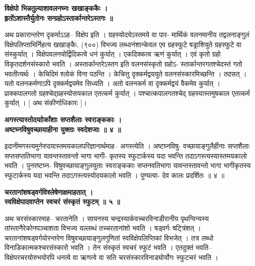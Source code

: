 \documentclass[11pt, openany]{book}
\begin{document}
{{{{\vspace{2mm}
\centering
\hspace{-1cm}
\textbf{
 विक्षेपो भिन्नतुल्याशावलनघ्नः खखाङ्ककैः ।\\
 हृतोंऽशास्तैर्युतोनः सन्ग्रहोऽस्तार्कान्तरेऽस्तगः ॥}

\newpage
\thispagestyle{fancy}
\fancyhf{}
\lhead{[संकीर्णाधिकारः]}
\justifying
 अथ प्रकारान्तरेण दृकर्माऽऽह-- विक्षेप इति । ग्रहस्योदयेऽस्तमये
वा पार-
मार्थिकं वलनमानीय तद्वलनाङ्गुलं विक्षेपलिप्ताभिर्निहत्य खखाङ्कैः.
(९००)
विभज्य लब्धानंशान्केवल एव ग्रहस्फुटे षड्राशियुते ग्रहस्फुटे वा
संस्कुर्यात् ।
विक्षेपवलनयोर्द्विदिकत्वे धनं कुर्यात् । एकदिक्कत्व ऋणं कुर्यात् ।
एवं कृतो
ग्रहो विकृतदर्शनसंस्कारो भवति । अस्तार्कान्तरेऽस्तग इति वलनसंस्कृतो
ग्रहोऽ-
स्तार्कान्तरगतश्चेदस्तं गतो भवतीत्यर्थः । केचिदिमं श्लोकं विना पठन्ति
। केचित्तु
दृक्कर्मद्वययुते वलनसंस्कारमिच्छन्ति । तदसत् । यतो वलनकर्मणाऽपि
दृक्कर्मद्वयमेव
सिध्यति । अतो वलनकर्म वा दृक्कर्मद्वयं वैकमेव कुर्यात् ।
प्राक्कपालगतो
ग्रहश्चेद्ग्रहस्योसयकाल एतत्कर्म कुर्यात् । पश्चात्कपालगतश्चेद्
ग्रहस्यास्तमुषकाल
एतत्कर्म कुर्यात् । [ अथ संकीर्णाधिकारः ]।

\vspace{2mm}
\centering
\hspace{-0.5cm}
\textbf{
 अगस्त्यास्तोदयाोर्कांशाः सप्तशैलाः स्वराङ्ककाः ।\\
 अष्टघ्नविषुवच्छायाहीना युक्ताः स्वदेशजाः ॥ ४ ॥}

\vspace{2mm}
\justifying
 इदानीमगस्त्यमुनेरुदयास्तमयकालपरिज्ञानार्थमाह-- अगस्त्येति ।
अष्टघ्नविषु-
वच्छायाङ्गुलैर्हीनाः सप्तशैलाः सप्तसप्ततिभागा यावन्तस्तावन्तो भागा भागी-
कृतस्य स्फुटार्कस्य यदा भवन्ति तदाऽगस्त्यस्यास्तमयकालो भवति ।
पुनरष्टघ्न-
विषुवच्छायाङ्गुलयुताः स्वराङ्ककाः सप्तनवतिभागा यावन्तस्तावन्तो भागा
भागीकृतस्य स्फुटार्कस्य यदा भवन्ति तदाऽगस्त्यस्योदयकालो भवति ।
पुण्यत्वा-
देव कालः प्रदर्शितः ॥ ४ ॥

\vspace{2mm}
\centering
\hspace{-1.8cm}
\textbf{
 चरतानांशषड्वर्गविश्लेषेणाक्षमाहतात् ।\\
 स्वविक्षेपादवाप्तेन स्वचरं संस्कृतं स्फुटम् ॥ ५ ॥}

\vspace{2mm}
\justifying
 अथ चरसंस्कारमाह-- चरतानेति । सायनस्य चन्द्रस्यार्कवच्चरविनाडीरानीय
पृथग्विन्यस्य तांस्तानैरेकोनपञ्चाशता विभज्य यल्लब्धं
तच्चरतानांशो
भवति । षड्वर्गः षट्त्रिंशत् । चरतानांशषड्वर्गयोरन्तरेण
विषुवच्छायाङ्गुलगुणितां
स्वविक्षेपलिप्तिकां विभजेत् । तत्र लब्धो
विनाडिकात्मकश्चरसंस्कारो
भवति । तेन संस्कृतं स्वचरं स्फुटं भवति । एतदुक्तं भवति--
विक्षेपरचरयोरुभयोरपि
धनत्वे वा ऋणत्वे वा सति चरसंस्कारविनाड्योर्योगः स्फुटचरं भवति ।

}}}}
\end{document}
